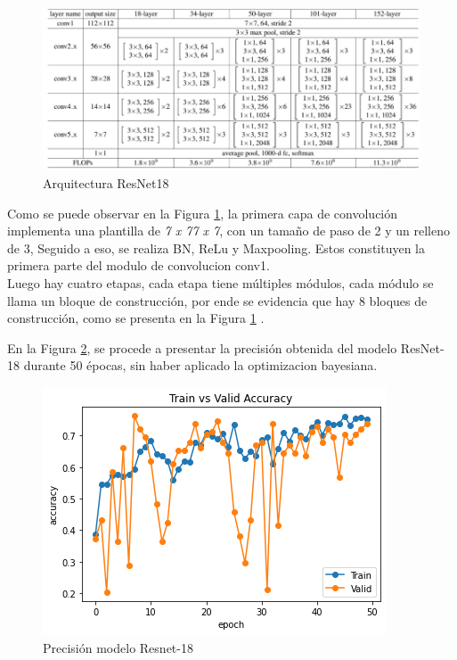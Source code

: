 \begin{figure}[ht]
	\centering
	\includegraphics[scale=0.65]{Figs/68.png}
	\caption{Arquitectura ResNet18}
	\label{fig:ArqRes18}
\end{figure}


Como se puede observar en la Figura \ref{fig:ArqRes18}, la primera capa de convolución implementa una plantilla de \textit{7 x 77 x 7}, con un tamaño de paso de 2 y un relleno de 3, Seguido a eso, se realiza BN, ReLu y Maxpooling. Estos constituyen la primera parte del modulo de convolucion conv1.\\

Luego hay cuatro etapas, cada etapa tiene múltiples módulos, cada módulo se llama un bloque de construcción, por ende se evidencia que hay 8 bloques de construcción, como se presenta en la Figura \ref{fig:ArqRes18} \cite{ref_5}.				


\newpage	
En la Figura \ref{fig:preci_RESNET18}, se procede a presentar la precisión obtenida del modelo ResNet-18 durante 50 épocas, sin haber aplicado la optimizacion bayesiana.

\begin{figure}[ht]
	\centering
	\includegraphics[scale=0.55]{Figs/109.png}
	\caption{Precisión modelo Resnet-18}
	\label{fig:preci_RESNET18}
\end{figure}


